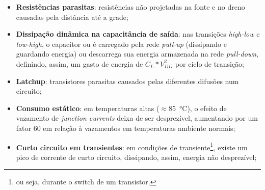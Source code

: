 \documentclass{iiufrgs}
\begin{document}
\begin{itemize}[noitemsep]
    \setlength{\itemindent}{1em}
    \item \textbf{Resistências parasitas}: resistências não projetadas na fonte e no dreno causadas pela distância até a grade;
    \item \textbf{Dissipação dinâmica na capacitância de saída}: nas transições \textit{high-low} e \textit{low-high}, o capacitor ou é carregado pela rede \textit{pull-up} (dissipando e guardando energia) ou descarrega sua energia armazenada na rede \textit{pull-down}, definindo, assim, um gasto de energia de $C_L*V_{DD}^2$ por ciclo de transição;
    \item \textbf{Latchup}: transistores parasitas causados pelas diferentes difusões num circuito;
    \item \textbf{Consumo estático}: em temperaturas altas ($\approx$\SI{85}{\degreeCelsius}), o efeito de vazamento de \textit{junction currents} deixa de ser desprezível, aumentando por um fator 60 em relação à vazamentos em temperaturas ambiente normais;
    \item \textbf{Curto circuito em transientes}: em condições de transiente\footnote{ou seja, durante o switch de um transistor.}, existe um pico de corrente de curto circuito, dissipando, assim, energia não desprezível;
\end{itemize}



 
\end{document}
